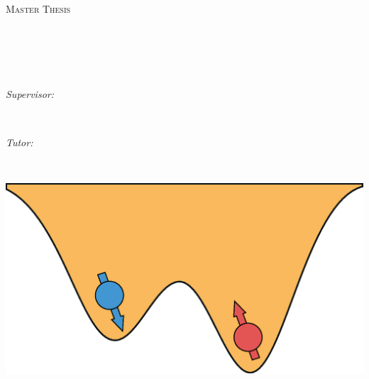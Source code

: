 \documentclass[
11pt, %
oneside, %
english, %
singlespacing, %
headsepline, %
consistentlayout, %
]{MastersDoctoralThesis} %
\author{David Fernández Fernández} %
\newcommand{\MYhref}[3][blue]{\href{#2}{\color{#1}{#3}}}
\begin{document}
\frontmatter %

\pagestyle{plain} %


\begin{titlepage}
\begin{center}

\vspace*{.06\textheight}
{\scshape\LARGE \univname\par}\vspace{1.5cm} %
\textsc{\Large Master Thesis}\\[0.5cm] %

\HRule \\[0.4cm] %
{\huge \bfseries \ttitle\par}\vspace{0.4cm} %
\HRule \\[1.5cm] %
 

\begin{minipage}[c]{\textwidth}
	\centering
	\LARGE
	\MYhref[black]{mailto:david.fernandezf03@estudiante.uam.es}{\authorname} %
\end{minipage}\\[1.0cm]
\begin{minipage}[c]{0.45\textwidth}
	\centering
	\large
	\emph{Supervisor:} \MYhref[black]{mailto:gplatero@icmm.csic.es}{\supname}\\ %
\end{minipage}\\[0.2cm]
\begin{minipage}[c]{0.45\textwidth}
	\centering
	\large
	\emph{Tutor:} \MYhref[black]{mailto:german.sierra@uam.es}{\examname}\\ %
\end{minipage}\\[0.6cm]


\vfill

\includegraphics[width=0.6\linewidth]{cover}\\ %


\end{center}
\end{titlepage}
\end{document}

